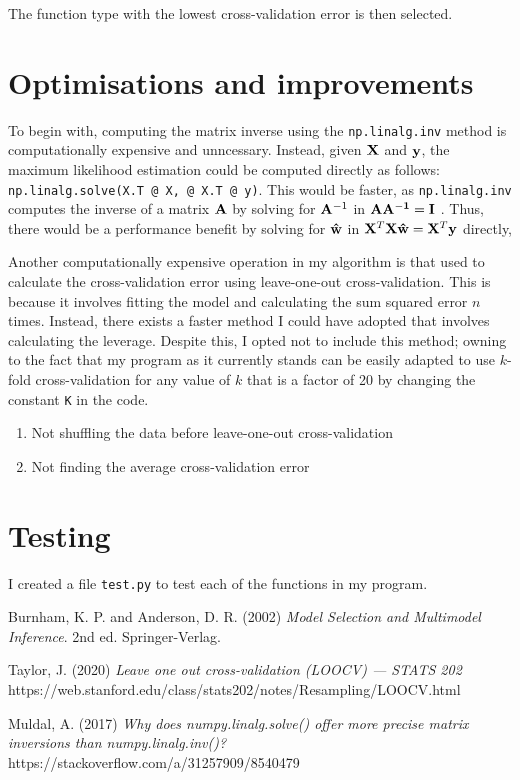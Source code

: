 \documentclass[onecolumn, 12pt, a4paper]{article}
\begin{document}
The function type with the lowest cross-validation error is then selected.

\section{Optimisations and improvements}

To begin with,
computing the matrix inverse using the \texttt{np.linalg.inv}
method is computationally expensive and unncessary.
Instead, given $\vb{X}$ and $\vb{y}$, the maximum likelihood
estimation could be computed directly as follows:
\texttt{np.linalg.solve(X.T @ X, @ X.T @ y)}.
This would be faster, as \texttt{np.linalg.inv}
computes the inverse of a matrix $\vb{A}$ by solving for $\vb{A}^{-1}$
in $\vb{AA^{-1} = I}$ \cite{StackOverflow}.
Thus, there would be a performance benefit by solving for
$\vb{\hat{w}}$ in
$\vb{X}^{T} \vb{X} \vb{\hat{w}} = \vb{X}^{T} \vb{y}$ directly,

Another computationally expensive operation in my
algorithm is that used to calculate the cross-validation error 
using leave-one-out cross-validation.
This is because it involves
fitting the model and calculating the sum squared error
$n$ times. 
Instead, there exists a faster method I could have
adopted that involves calculating the leverage.
Despite this, I opted not to include this method; 
owning to the fact that my program as it
currently stands can be easily adapted to use $k$-fold
cross-validation for any value of $k$ that is a factor of 20
by changing the constant \texttt{K} in the code.

\begin{enumerate}
    \item{Not shuffling the data before leave-one-out cross-validation}
    \item{Not finding the average cross-validation error}
\end{enumerate}

\section{Testing}

I created a file \texttt{test.py} to test each of the
functions in my program.

\begin{thebibliography}{9}

    Burnham, K. P. and Anderson, D. R. (2002)
    \textit{Model Selection and Multimodel Inference}.
    2nd ed. Springer-Verlag.

    Taylor, J. (2020)
    \textit{Leave one out cross-validation (LOOCV) --- STATS 202}
    https://web.stanford.edu/class/stats202/notes/Resampling/LOOCV.html

    Muldal, A. (2017)
    \textit{Why does numpy.linalg.solve() offer more precise matrix inversions than numpy.linalg.inv()?}
    https://stackoverflow.com/a/31257909/8540479



\end{thebibliography}
    
\end{document}
